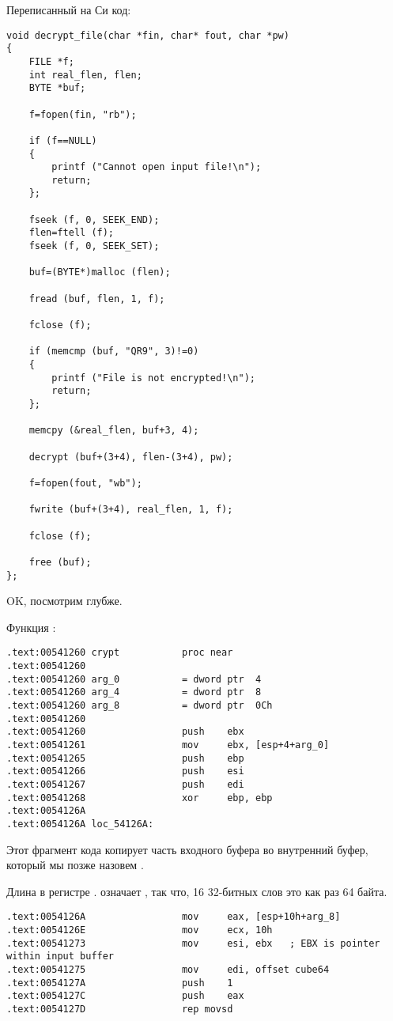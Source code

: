 Переписанный на Си код:

\begin{lstlisting}[style=customc]
void decrypt_file(char *fin, char* fout, char *pw)
{
	FILE *f;
	int real_flen, flen;
	BYTE *buf;

	f=fopen(fin, "rb");
	
	if (f==NULL)
	{
		printf ("Cannot open input file!\n");
		return;
	};

	fseek (f, 0, SEEK_END);
	flen=ftell (f);
	fseek (f, 0, SEEK_SET);

	buf=(BYTE*)malloc (flen);

	fread (buf, flen, 1, f);

	fclose (f);

	if (memcmp (buf, "QR9", 3)!=0)
	{
		printf ("File is not encrypted!\n");
		return;
	};

	memcpy (&real_flen, buf+3, 4);

	decrypt (buf+(3+4), flen-(3+4), pw);
	
	f=fopen(fout, "wb");

	fwrite (buf+(3+4), real_flen, 1, f);

	fclose (f);

	free (buf);
};
\end{lstlisting}

OK, посмотрим глубже.

Функция :

\begin{lstlisting}[style=customasm]
.text:00541260 crypt           proc near
.text:00541260
.text:00541260 arg_0           = dword ptr  4
.text:00541260 arg_4           = dword ptr  8
.text:00541260 arg_8           = dword ptr  0Ch
.text:00541260
.text:00541260                 push    ebx
.text:00541261                 mov     ebx, [esp+4+arg_0]
.text:00541265                 push    ebp
.text:00541266                 push    esi
.text:00541267                 push    edi
.text:00541268                 xor     ebp, ebp
.text:0054126A
.text:0054126A loc_54126A:
\end{lstlisting}

Этот фрагмент кода копирует часть входного буфера во внутренний буфер, который мы позже назовем .%

Длина в регистре \ECX.  означает , так что, 16 32-битных слов
это как раз 64 байта.

\begin{lstlisting}[style=customasm]
.text:0054126A                 mov     eax, [esp+10h+arg_8]
.text:0054126E                 mov     ecx, 10h
.text:00541273                 mov     esi, ebx   ; EBX is pointer within input buffer
.text:00541275                 mov     edi, offset cube64
.text:0054127A                 push    1
.text:0054127C                 push    eax
.text:0054127D                 rep movsd
\end{lstlisting}

